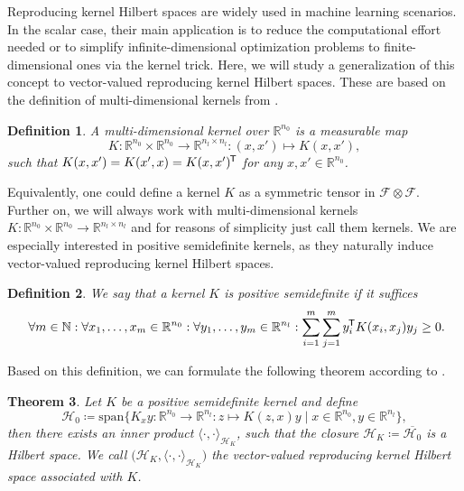 \documentclass[11pt, a4paper]{article}
\newtheorem{theorem}{Theorem}[section]
\newtheorem{definition}[theorem]{Definition}
\newcommand{\N}{\mathbb{N}}
\newcommand{\R}{\mathbb{R}}
\newcommand{\F}{\mathcal{F}}
\renewcommand{\H}{\mathcal{H}}
\newcommand*{\tr}{^{\mkern-1.5mu\mathsf{T}}}
\begin{document}
Reproducing kernel Hilbert spaces are widely used in machine learning scenarios. In the scalar case, their main application is to reduce the computational effort needed or to simplify infinite-dimensional optimization problems to finite-dimensional ones via the kernel trick. Here, we will study a generalization of this concept to vector-valued reproducing kernel Hilbert spaces. These are based on the definition of multi-dimensional kernels from \cite{NTK}.

\begin{definition}
A multi-dimensional kernel over $\R^{n_0}$ is a measurable map
\[ K: \R^{n_0} \times \R^{n_0} \to \R^{n_l \times n_l} : (x,x') \mapsto K(x,x'), \]
such that $K(x,x') = K(x',x) = K(x,x')\tr$ for any $x,x' \in \R^{n_0}$.
\end{definition}

Equivalently, one could define a kernel $K$ as a symmetric tensor in $\F \otimes \F$. Further on, we will always work with multi-dimensional kernels $K: \R^{n_0} \times \R^{n_0} \to \R^{n_l \times n_l}$ and for reasons of simplicity just call them kernels. We are especially interested in positive semidefinite kernels, as they naturally induce vector-valued reproducing kernel Hilbert spaces.

\begin{definition}
We say that a kernel $K$ is positive semidefinite if it suffices
\[ \forall m \in \N : \forall x_1, \dots, x_m \in \R^{n_0} : \forall y_1, \dots, y_m \in \R^{n_l}: \sum_{i=1}^{m} \sum_{j=1}^{m} y_i \tr K(x_i, x_j) y_j \geq 0. \]
\end{definition}

Based on this definition, we can formulate the following theorem according to \cite{RKHS}.

\begin{theorem} \label{thm:rkhs}
Let $K$ be a positive semidefinite kernel and define
\[ \H_0 \coloneq \text{span} \Big \{ K_xy : \R^{n_0} \to \R^{n_l} : z \mapsto K(z,x)y \mid x \in \R^{n_0}, y \in \R^{n_l} \Big \}, \]
then there exists an inner product $\langle \cdot, \cdot \rangle_{\H_K}$, such that the closure $\H_K \coloneq \overline{\H_0}$ is a Hilbert space.
We call $\big (\H_K, \langle \cdot, \cdot \rangle_{\H_K} \big )$ the vector-valued reproducing kernel Hilbert space associated with $K$.
\end{theorem}
\end{document}
